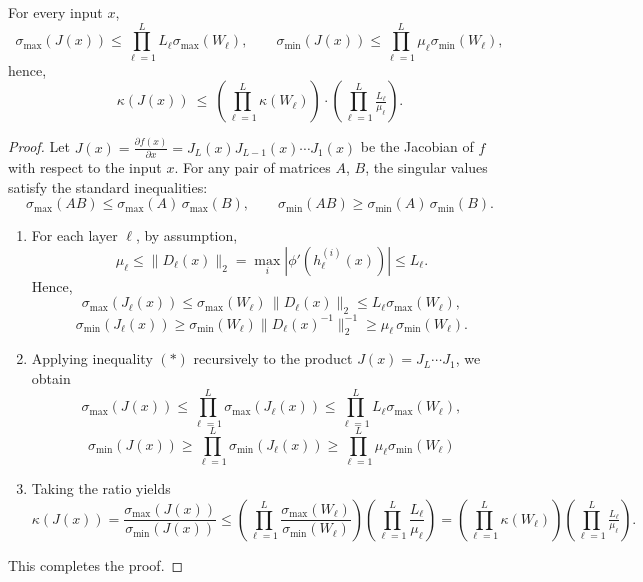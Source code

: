 \documentclass[10pt,a4paper]{amsart}
\begin{document}
\begin{proposition} 
\label{prop:layerwise}
For every input $x$,
\[
\sigma_{\max}(J(x)) \le \prod_{\ell=1}^L L_\ell \sigma_{\max}(W_\ell), \qquad \sigma_{\min}(J(x)) \le \prod_{\ell=1}^L\mu_\ell\sigma_{\min}(W_\ell),
\]
hence,
\[
\boxed{\kappa\left(J(x)\right)\ \le\
\left(\prod_{\ell=1}^{L}\kappa(W_\ell)\right)\cdot
\left(\prod_{\ell=1}^{L}\tfrac{L_\ell}{\mu_\ell}\right)}.
\]
\end{proposition}

\begin{proof}
Let $J(x) = \frac{\partial f(x)}{\partial x} = J_L(x)J_{L-1}(x)\cdots J_1(x)$ be the Jacobian of $f$ with respect to the input $x$. For any pair of matrices $A$, $B$, the singular values satisfy the standard inequalities:
\[
\sigma_{\max}(AB)\le\sigma_{\max}(A)\,\sigma_{\max}(B),
\qquad
\sigma_{\min}(AB)\ge\sigma_{\min}(A)\,\sigma_{\min}(B).
\tag{$*$}
\]
\begin{enumerate}
\item For each layer $\ell$, by assumption,
\[
\mu_\ell \le \|D_\ell(x)\|_2 = \max_i|\phi'(h_\ell^{(i)}(x))| \le L_\ell.
\]
Hence, 
\[
\sigma_{\max}(J_\ell(x))
\le \sigma_{\max}(W_\ell)\,\|D_\ell(x)\|_2
\le L_\ell\sigma_{\max}(W_\ell),
\]
\[
\sigma_{\min}(J_\ell(x))
\ge \sigma_{\min}(W_\ell)\|D_\ell(x)^{-1}\|_2^{-1}
\ge \mu_\ell\,\sigma_{\min}(W_\ell).
\]
\item Applying inequality $(*)$ recursively to the product $J(x) = J_L \cdots J_1$, we obtain
\[
\sigma_{\max}(J(x)) \le \prod_{\ell=1}^L \sigma_{\max}(J_\ell(x)) \le \prod_{\ell=1}^L L_\ell\sigma_{\max}(W_\ell),
\]
\[
\sigma_{\min}(J(x)) \ge \prod_{\ell=1}^L \sigma_{\min}(J_\ell(x)) \ge \prod_{\ell=1}^L\mu_{\ell}\sigma_{\min}(W_\ell)
\]
\item Taking the ratio yields
\[
\kappa(J(x))
=\frac{\sigma_{\max}(J(x))}{\sigma_{\min}(J(x))}
\le
\left(\prod_{\ell=1}^{L}\frac{\sigma_{\max}(W_\ell)}{\sigma_{\min}(W_\ell)}\right)
\left(\prod_{\ell=1}^{L}\frac{L_\ell}{\mu_\ell}\right)
=
\left(\prod_{\ell=1}^{L}\kappa(W_\ell)\right)
\left(\prod_{\ell=1}^{L}\tfrac{L_\ell}{\mu_\ell}\right).
\]
\end{enumerate}
This completes the proof.
\end{proof}
\end{document}
